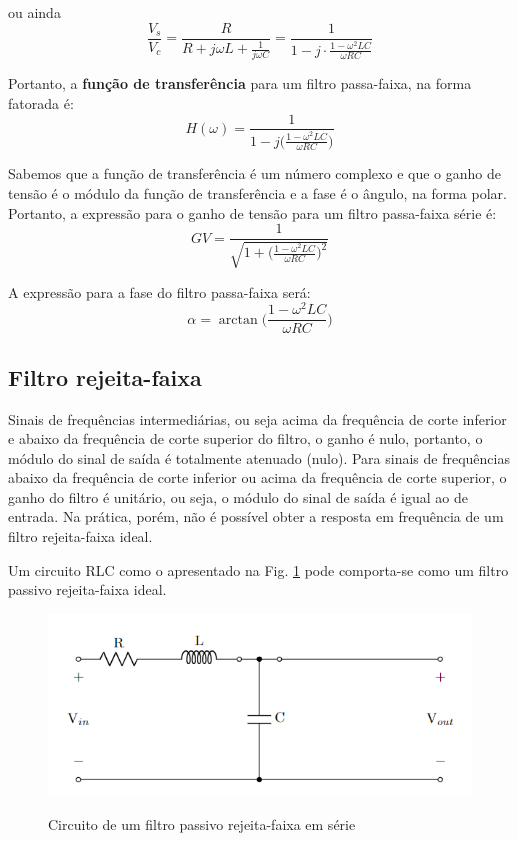 \documentclass[letterpaper, 12pt]{article}
\begin{document}
ou ainda
\begin{equation}\label{V_s/V_c}
    \frac{V_{s}}{V_{c}}=\frac{R}{R+j\omega L+\frac{1}{j\omega C}}=\frac{1}{1-j\cdot\frac{1-\omega^{2}LC}{\omega RC}}
\end{equation}

Portanto, a \textbf{função de transferência} para um filtro passa-faixa, na forma fatorada é:
\begin{equation}\label{H(omega)}
    H(\omega)=\frac{1}{1-j\Big(\frac{1-\omega^{2}LC}{\omega RC}\Big)}
\end{equation}

Sabemos que a função de transferência é um número complexo e que o ganho de tensão é o módulo da função de transferência e a fase é o ângulo, na forma polar. Portanto, a expressão para o ganho de tensão para um filtro passa-faixa série é:
\begin{equation}\label{eq: Ganho de tensão}
    GV=\frac{1}{\sqrt{1+\Big(\frac{1-\omega^{2}LC}{\omega RC}\Big)^{2}}}
\end{equation}

A expressão para a fase do filtro passa-faixa será:
\begin{equation}\label{eq: Fase de um filtro}
    \alpha=\arctan{\Bigg(\frac{1-\omega^{2}LC}{\omega RC}\Bigg)}
\end{equation}


\subsection{Filtro rejeita-faixa}\label{SubSec - Rejeita-Faixa}
Sinais de frequências intermediárias, ou seja acima da frequência de corte inferior e abaixo da frequência de corte superior do filtro, o ganho é nulo, portanto, o módulo do sinal de saída é totalmente atenuado (nulo). Para sinais de frequências abaixo da frequência de corte inferior ou acima da frequência de corte superior, o ganho do filtro é unitário, ou seja, o módulo do sinal de saída é igual ao de entrada. Na prática, porém, não é possível obter a resposta em frequência de um filtro rejeita-faixa ideal.

Um circuito RLC como o apresentado na Fig. \ref{fig:Band-stop_filter} pode comporta-se como um filtro passivo rejeita-faixa ideal.
\begin{figure}[h]
    \centering
    \includegraphics[width=0.5\linewidth]{figures/Band-stop_filter.png}
    \label{fig:Band-stop_filter}
    \caption{Circuito de um filtro passivo rejeita-faixa em série}
\end{figure}
\end{document}
